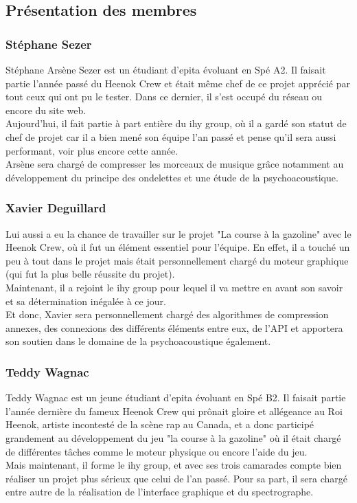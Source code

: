 \documentclass[a4paper,12pt]{article}
\begin{document}
	\subsection{Présentation des membres}

		\subsubsection{Stéphane Sezer}
Stéphane Arsène  Sezer est un  étudiant d'epita évoluant  en Spé A2.  Il
faisait partie  l'année passé du  Heenok Crew et  était même chef  de ce
projet apprécié par tout ceux qui ont pu le tester.  Dans ce dernier, il
s'est occupé du réseau ou encore du site web.\\
Aujourd'hui,  il fait partie à part entière du ihy group,  où il a gardé
son statut de chef de projet car il a bien mené son équipe l'an passé et
pense qu'il sera aussi performant, voir plus encore cette année.\\
Arsène sera chargé de compresser les morceaux de musique grâce notamment
au  développement  du  principe  des  ondelettes  et  une  étude  de  la
psychoacoustique.

		\subsubsection{Xavier Deguillard}
Lui aussi  a eu la  chance de travailler sur  le projet "La  course à la
gazoline"  avec le  Heenok Crew,  où  il fut  un élément  essentiel pour
l'équipe.  En effet, il a touché un peu à tout dans le projet mais était
personnellement  chargé  du moteur  graphique  (qui  fut  la  plus belle
réussite du projet).\\
Maintenant,  il a rejoint le ihy group pour lequel il va mettre en avant
son savoir et sa détermination inégalée à ce jour.\\
Et  donc,   Xavier  sera  personnellement   chargé  des  algorithmes  de
compression annexes,  des connexions des  différents éléments entre eux,
de l'API et apportera son soutien dans le domaine de la psychoacoustique
également.

		\subsubsection{Teddy Wagnac}
Teddy Wagnac est  un  jeune  étudiant  d'epita  évoluant  en Spé B2.  Il
faisait partie l'année dernière du fameux Heenok Crew qui prônait gloire
et  allégeance au  Roi Heenok,  artiste  incontesté de  la scène  rap au
Canada,  et a donc  participé  grandement  au  développement  du jeu "la
course à la gazoline" où il  était chargé de différentes tâches comme le
moteur physique ou encore l'aide du jeu.\\
Mais maintenant,  il  forme le ihy  group,  et avec ses  trois camarades
compte bien  réaliser un projet plus  sérieux que  celui de  l'an passé.
Pour  sa  part,  il  sera  chargé  entre  autre  de  la  réalisation  de
l'interface graphique et du spectrographe.
\end{document}
